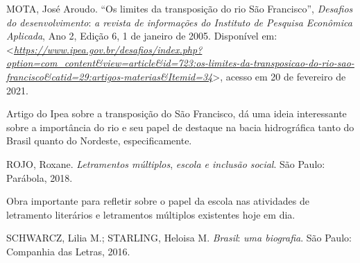 \documentclass{extrarticle}
\begin{document}
    MOTA, José Aroudo. ``Os limites da transposição do rio São
    Francisco'', \emph{Desafios do desenvolvimento}: \emph{a revista de
    informações do Instituto de Pesquisa Econômica Aplicada}, Ano 2,
    Edição 6, 1 de janeiro de 2005. Disponível em:
    \textless{}\href{https://www.ipea.gov.br/desafios/index.php?option=com_content\&view=article\&id=723:os-limites-da-transposicao-do-rio-sao-francisco\&catid=29:artigos-materias\&Itemid=34}{\emph{https://www.ipea.gov.br/desafios/index.php?option=com\_content\&view=article\&id=723:os-limites-da-transposicao-do-rio-sao-francisco\&catid=29:artigos-materias\&Itemid=34}}\textgreater{},
    acesso em 20 de fevereiro de 2021.

    Artigo do Ipea sobre a transposição do São Francisco, dá uma ideia
    interessante sobre a importância do rio e seu papel de destaque na
    bacia hidrográfica tanto do Brasil quanto do Nordeste,
    especificamente.

    ROJO, Roxane. \emph{Letramentos múltiplos}, \emph{escola e inclusão
    social}. São Paulo: Parábola, 2018.

    Obra importante para refletir sobre o papel da escola nas atividades
    de letramento literários e letramentos múltiplos existentes hoje em
    dia.

    \textsc{SCHWARCZ,} Lilia M.; \textsc{STARLING}, Heloisa M.
    \emph{Brasil}: \emph{uma biografia}. São Paulo: Companhia das
    Letras, 2016.
\end{document}
